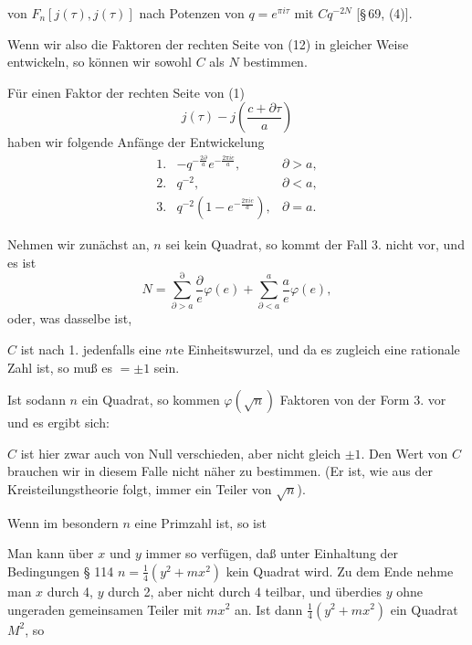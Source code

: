 von $F_n[j(\tau), j(\tau)]$ nach Potenzen von $q=e^{\pi i \tau}$ mit $Cq^{-2N}$
[§\,69, (4)].

Wenn wir also die Faktoren der rechten Seite von (12) in gleicher Weise
entwickeln, so können wir sowohl $C$ als $N$ bestimmen.

Für einen Faktor der rechten Seite von (1) %
\[
j(\tau) - j\left(\frac{c+\partial\tau}{a}\right)
\]
haben wir folgende Anfänge der Entwickelung
\[
\begin{array}{lll}
1. & -q^{-\frac{2\partial}{a}} e^{-\frac{2\pi i c}{a}}, & \partial > a,\\
2. & q^{-2}, & \partial < a,\\
3. & q^{-2}\left(1-e^{-\frac{2\pi i c}{a}}\right), & \partial = a.
\end{array}
\]

Nehmen wir zunächst an, $n$ sei kein Quadrat, so kommt der Fall 3. nicht
vor, und es ist
\[
N = \sum_{\partial > a}^{\partial} \frac{\partial}{e}\varphi(e) + \sum_{\partial < a}^{a} \frac{a}{e}\varphi(e),
\]
oder, was dasselbe ist,

$C$ ist nach 1. jedenfalls eine $n$te Einheitswurzel, und da es zugleich
eine rationale Zahl ist, so muß es $=\pm 1$ sein.

Ist sodann $n$ ein Quadrat, so kommen $\varphi(\sqrt{n})$ Faktoren von der
Form 3. vor und es ergibt sich:

$C$ ist hier zwar auch von Null verschieden, aber nicht gleich $\pm 1$.
Den Wert von $C$ brauchen wir in diesem Falle nicht näher zu bestimmen.
(Er ist, wie aus der Kreisteilungstheorie folgt, immer ein Teiler von
$\sqrt{n}$).

Wenn im besondern $n$ eine Primzahl ist, so ist

Man kann über $x$ und $y$ immer so verfügen, daß unter Einhaltung der
Bedingungen § 114 $n = \frac{1}{4}(y^2+mx^2)$ kein Quadrat wird. Zu dem
Ende nehme man $x$ durch 4, $y$ durch 2, aber nicht durch 4 teilbar, und
überdies $y$ ohne ungeraden gemeinsamen Teiler mit $mx^2$ an. Ist dann
$\frac{1}{4}(y^2+mx^2)$ ein Quadrat $M^2$, so
